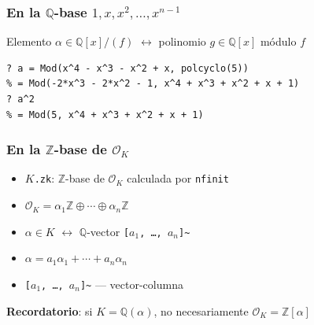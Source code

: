 \documentclass{beamer}
\newcommand{\ZZ}{\mathbb{Z}}
\newcommand{\QQ}{\mathbb{Q}}
\renewcommand{\O}{\mathcal{O}}
\begin{document}

\begin{frame}[fragile]
  \frametitle{En la $\QQ$-base $1,x,x^2,\ldots,x^{n-1}$}

  Elemento $\alpha \in \QQ[x]/(f)$ $\longleftrightarrow$ polinomio $g \in \QQ [x]$ módulo $f$

  \begin{shaded}\small
\begin{verbatim}
? a = Mod(x^4 - x^3 - x^2 + x, polcyclo(5))
% = Mod(-2*x^3 - 2*x^2 - 1, x^4 + x^3 + x^2 + x + 1)
? a^2
% = Mod(5, x^4 + x^3 + x^2 + x + 1)
\end{verbatim}
  \end{shaded}
\end{frame}


\begin{frame}[fragile]
  \frametitle{En la $\ZZ$-base de $\O_K$}

  \begin{itemize}
  \item \texttt{$K$.zk}: $\ZZ$-base de $\O_K$ calculada por \texttt{nfinit}

  \item $\O_K = \alpha_1 \ZZ \oplus \cdots \oplus \alpha_n \ZZ$

  \item $\alpha \in K$ $\longleftrightarrow$ $\QQ$-vector
    \texttt{[$a_1$, \ldots, $a_n$]\textasciitilde}

  \item $\alpha = a_1 \alpha_1 + \cdots + a_n \alpha_n$

  \item \texttt{[$a_1$, \ldots, $a_n$]\textasciitilde} --- vector-columna
  \end{itemize}

  \vspace{1em}

  \textbf{Recordatorio}: si $K = \QQ (\alpha)$, no necesariamente
  $\O_K = \ZZ [\alpha]$
\end{frame}

\end{document}
